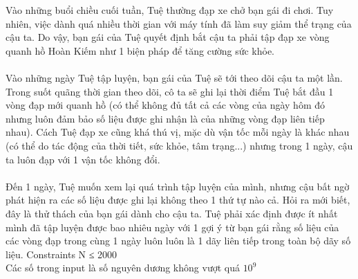 Vào những buổi chiều cuối tuần, Tuệ thường đạp xe chở bạn gái đi chơi. Tuy nhiên, việc dành quá nhiều thời gian với máy tính đã làm suy giảm thể trạng của cậu ta. Do vậy, bạn gái của Tuệ quyết định bắt cậu ta phải tập đạp xe vòng quanh hồ Hoàn Kiếm như 1 biện pháp để tăng cường sức khỏe.   
\\
\\   Vào những ngày Tuệ tập luyện, bạn gái của Tuệ sẽ tới theo dõi cậu ta một lần. Trong suốt quãng thời gian theo dõi, cô ta sẽ ghi lại thời điểm Tuệ bắt đầu 1 vòng đạp mới quanh hồ (có thể không đủ tất cả các vòng của ngày hôm đó nhưng luôn đảm bảo số liệu được ghi nhận là của những vòng đạp liên tiếp nhau). Cách Tuệ đạp xe cũng khá thú vị, mặc dù vận tốc mỗi ngày là khác nhau (có thể do tác động của thời tiết, sức khỏe, tâm trạng...) nhưng trong 1 ngày, cậu ta luôn đạp với 1 vận tốc không đổi.   
\\
\\   Đến 1 ngày, Tuệ muốn xem lại quá trình tập luyện của mình, nhưng cậu bất ngờ phát hiện ra các số liệu được ghi lại không theo 1 thứ tự nào cả. Hỏi ra mới biết, đây là thử thách của bạn gái dành cho cậu ta. Tuệ phải xác định được ít nhất mình đã tập luyện được bao nhiêu ngày với 1 gợi ý từ bạn gái rằng số liệu của các vòng đạp trong cùng 1 ngày luôn luôn là 1 dãy liên tiếp trong toàn bộ dãy số liệu.
Constraints
N ≤ 2000   
\\   Các số trong input là số nguyên dương không vượt quá $10^{9}$